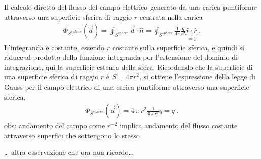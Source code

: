 \documentclass[letterpaper,10pt,italian]{jupyterBook}
\begin{document}
\sphinxAtStartPar
{}
Il calcolo diretto del flusso del campo elettrico generato da una carica puntiforme attraverso una superficie sferica di raggio \(r\) centrata nella carica
\begin{equation*}
\begin{split}\Phi_{S^{sphere}}(\vec{d}) = \oint_{S^{sphere}} \vec{d} \cdot \hat{n} = \oint_{S^{sphere}} \frac{1}{4 \pi }\frac{q}{r^2} \underbrace{\hat{r} \cdot \hat{r}}_{=1} \ .  \end{split}
\end{equation*}
\sphinxAtStartPar
L’integranda è costante, essendo \(r\) costante sulla superficie sferica, e quindi si riduce al prodotto della funzione integranda per l’estensione del dominio di integrazione, qui la superficie estenra della sfera. Ricordando che la superficie di una superficie sferica di raggio \(r\) è \(S = 4 \pi r^2\), si ottiene l’espressione della legge di Gauss per il campo elettrico di una carica puntiforme attraverso una superficie sferica,
\begin{equation*}
\begin{split}\Phi_{S^{sphere}}(\vec{d}) = 4 \, \pi \, r^2 \frac{1}{4 \, \pi \, r^2} q = q \ .\end{split}
\end{equation*}
\sphinxAtStartPar
{} obs: andamento del campo come \(r^{-2}\) implica andamento del flusso costante attraverso superfici che sottengono lo stesso 

\sphinxAtStartPar
{} … altra osservazione che ora non ricordo…
\end{document}
